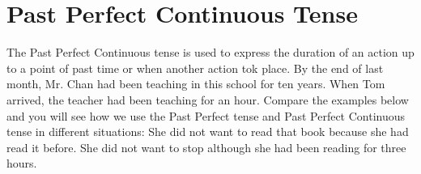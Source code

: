 \newpage
\section{Past Perfect Continuous Tense}
The Past Perfect Continuous tense is used to express the duration of an action
up to a point of past time or when another action tok place.
\newline
By the end of last month, Mr. Chan had been teaching in this school for ten
years.
\newline
When Tom arrived, the teacher had been teaching for an hour.
\newline
\newline
Compare the examples below and you will see how we use the Past Perfect tense
and Past Perfect Continuous tense in different situations:
\newline
\newline
She did not want to read that book because she had read it before.
\newline
She did not want to stop although she had been reading for three hours.
